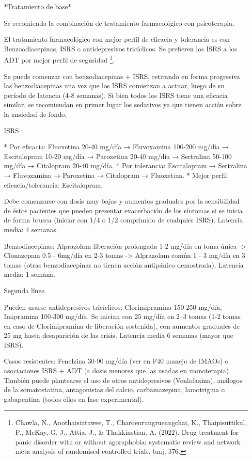 \documentclass{scrbook}
\begin{document}
*Tratamiento de base*

Se recomienda la combinación de tratamiento farmacológico con psicoterapia. 

El tratamiento farmacológico con mejor perfil de eficacia y tolerancia es con Benzoadiacepinas, ISRS o antidepresivos tricíclicos. Se prefieren los ISRS a los ADT por mejor perfil de seguridad \footnote{Chawla, N., Anothaisintawee, T., Charoenrungrueangchai, K., Thaipisuttikul, P., McKay, G. J., Attia, J., \& Thakkinstian, A. (2022). Drug treatment for panic disorder with or without agoraphobia: systematic review and network meta-analysis of randomised controlled trials. bmj, 376.}.

Se puede comenzar con benzodiacepinas + ISRS, retirando en forma progresiva las benzodiacepinas una vez que los ISRS comienzan a actuar, luego de su período de latencia (4-8 semanas). Si bien todos los ISRS tiene una eficacia similar, se recomiendan en primer lugar los sedativos ya que tienen acción sobre la ansiedad de fondo.

ISRS : 

* Por eficacia: Fluoxetina 20-40 mg/día → Fluvoxamina 100-200 mg/día → Escitalopram 10-20 mg/día → Paroxetina 20-40 mg/día → Sertralina 50-100 mg/día → Citalopram 20-40 mg/día.
* Por tolerancia: Escitalopram → Sertralina → Fluvoxamina → Paroxetina → Citalopram → Fluoxetina.
* Mejor perfil eficacia/tolerancia: Escitalopram.

Debe comenzarse con dosis muy bajas y aumentos graduales por la sensibilidad de éstos pacientes que pueden presentar exacerbación de los síntomas si se inicia de forma brusca (iniciar con 1/4 o 1/2 comprimido de cualquier ISRS). Latencia media: 4 semanas.

Benzodiacepinas: Alprazolam liberación prolongada 1-2 mg/día en toma única -> Clonazepam 0.5 - 6mg/día en 2-3 tomas -> Alprazolam común 1 - 3 mg/día en 3 tomas (otras benzodiacepinas no tienen acción antipánico demostrada). Latencia media: 1 semana.

Segunda línea

Pueden usarse antidepresivos tricíclicos: Clorimipramina 150-250 mg/día, Imipramina 100-300 mg/día. Se inician con 25 mg/día en 2--3 tomas (1-2 tomas en caso de Clorimipramina de liberación sostenida), con aumentos graduales de 25 mg hasta desaparición de las crisis. Latencia media 6 semanas (mayor que ISRS).

Casos resistentes: Fenelzina 30-90 mg/día (ver en F40 manejo de IMAOs) o asociaciones ISRS + ADT (a dosis menores que las usadas en monoterapia). También puede plantearse el uso de otros antidepresivos (Venlafaxina), análogos de la somatostatina, antagonistas del calcio, carbamazepina, lamotrigina o gabapentina (todos ellos en fase experimental).
\end{document}
